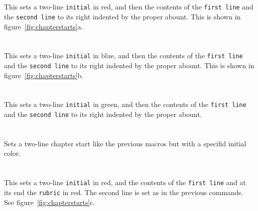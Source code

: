 \documentclass[a4paper, 12pt]{article}
\begin{document}
\paragraph{}\mbox{}\\

This sets a two-line \texttt{initial} in red, and then the
contents of the \texttt{first line} and the \texttt{second line} to
its right indented by the proper abount. This is shown in
figure~\ref{fig:chapterstarts}a. 

\paragraph{}\mbox{}\\

This sets a two-line \texttt{initial} in blue, and then the
contents of the \texttt{first line} and the \texttt{second line} to
its right indented by the proper abount. This is shown in
figure~\ref{fig:chapterstarts}b. 

\paragraph{}\mbox{}\\

This sets a two-line \texttt{initial} in green, and then the
contents of the \texttt{first line} and the \texttt{second line} to
its right indented by the proper abount. 

\paragraph{}\mbox{}\\

Sets a two-line chapter start like the previous macros but with a
specifid initial color. 

\paragraph{}\mbox{}\\

This sets a two-line \texttt{initial} in red, and the
contents of the \texttt{first line} and at its end the \texttt{rubric}
in red. The second line is set as in the previous commands. 
See figure~\ref{fig:chapterstarts}c. 
\end{document}
